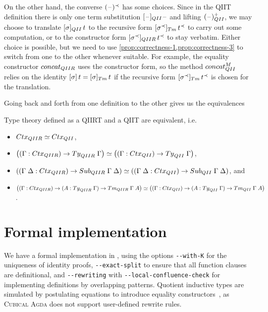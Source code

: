 \documentclass[a4paper,UKenglish,numberwithinsect,cleveref,thm-restate]{lipics-v2021}
\newcommand{\Fredrik}[2][]{\todo[inline,author={Fred},caption={},#1]{#2}}
\begin{document}
On the other hand, the converse $(\mathord{\hspace{1pt}\text{--}\hspace{1pt}})^{\prec}$ has some choices.
Since in the QIIT definition there is only one term substitution $[\blank]_{\I}\blank$ and lifting $(\blank)^+_{\I}$, we may choose to translate $[\sigma]_{\I} \,t$ to the recursive form $[\sigma^{\prec}]_{\Tm}\,t^{\prec}$ to carry out some computation, or to the constructor form $[\sigma^{\prec}]_{\IR}\,t^{\prec}$ to stay verbatim.
Either choice is possible, but we need to use \cref{prop:correctness-1,prop:correctness-3} to switch from one to the other whenever suitable.
For example, the equality constructor $\mathsf{concat}_{\IR}$ uses the constructor form, so the method $\mathsf{concat}^M_{\I}$ relies on the identity $[ \sigma ]\,t = [\sigma]_{\Tm}\,t$ if the recursive form $[\sigma^{\prec}]_{\Tm}\,t^{\prec}$ is chosen for the translation.

Going back and forth from one definition to the other gives us the equivalences
\begin{theorem}
  Type theory defined as a QIIRT and a QIIT are equivalent, i.e.\ 
  \begin{itemize}
    \item $\eqv{\Ctx_{\IR}}{\Ctx_{\I}}$, 
    \item $\eqv{\left((\Gamma : \Ctx_{\IR})\to\Ty_{\IR}\;\Gamma\right)}{\left((\Gamma : \Ctx_{\I})\to\Ty_{\I}\;\Gamma\right)}$,
    \item $\eqv{\left((\Gamma\;\Delta : \Ctx_{\IR}) \to \Sub_{\IR}\;\Gamma\;\Delta\right)}%
               {\left((\Gamma\;\Delta: \Ctx_{\I}) \to \Sub_{\I}\;\Gamma\;\Delta\right)}$, and 
    \item $\eqv{\left((\Gamma : \Ctx_{\IR}) \to (A : \Ty_{\IR}\;\Gamma) \to \Tm_{\IR}\;\Gamma\;A\right)}
               {\left((\Gamma : \Ctx_{\I}) \to (A : \Ty_{\I}\;\Gamma) \to \Tm_{\I}\;\Gamma\;A\right)}$.
  \end{itemize}
\end{theorem}

\section{Formal implementation} \label{sec:formal-implementation}

We have a formal implementation in \Agda, using the options \texttt{-{}-with-K} for the uniqueness of identity proofs, \texttt{-{}-exact-split} to ensure that all function clauses are definitional, and \texttt{-{}-rewriting} with \texttt{-{}-local-confluence-check} for implementing definitions by overlapping patterns.
Quotient inductive types are simulated by postulating equations to introduce equality constructors~\cite{Licata2011}, as \textsc{Cubical Agda} does not support user-defined rewrite rules.
\end{document}
